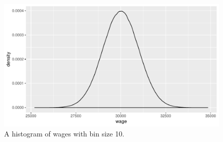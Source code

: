 \documentclass[]{report}\usepackage[]{graphicx}\usepackage[]{color}
\makeatletter
\def\maxwidth{ %
  \ifdim\Gin@nat@width>\linewidth
    \linewidth
  \else
    \Gin@nat@width
  \fi
}
\newenvironment{knitrout}{}{} %
\makeatother
\begin{document}
\begin{knitrout}
\color{fgcolor}\begin{figure}

{\centering \includegraphics[width=\maxwidth]{figure/densitywages-1} 

}

\caption[A histogram of wages with bin size 10]{A histogram of wages with bin size 10.}\label{fig:densitywages}
\end{figure}


\end{knitrout}





% 
\end{document}
